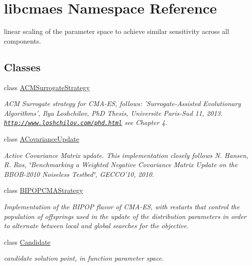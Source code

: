 \hypertarget{namespacelibcmaes}{\section{libcmaes Namespace Reference}
\label{namespacelibcmaes}
}


linear scaling of the parameter space to achieve similar sensitivity across all components.  


\subsection*{Classes}
\begin{DoxyCompactItemize}
\item 
class \hyperlink{classlibcmaes_1_1ACMSurrogateStrategy}{A\+C\+M\+Surrogate\+Strategy}
\begin{DoxyCompactList}\small\item\em A\+C\+M Surrogate strategy for C\+M\+A-\/\+E\+S, follows\+: 'Surrogate-\/\+Assisted Evolutionary Algorithms', Ilya Loshchilov, Ph\+D Thesis, Universite Paris-\/\+Sud 11, 2013. \href{http://www.loshchilov.com/phd.html}{\tt http\+://www.\+loshchilov.\+com/phd.\+html} see Chapter 4. \end{DoxyCompactList}\item 
class \hyperlink{classlibcmaes_1_1ACovarianceUpdate}{A\+Covariance\+Update}
\begin{DoxyCompactList}\small\item\em Active Covariance Matrix update. This implementation closely follows N. Hansen, R. Ros, \char`\"{}\+Benchmarking a Weighted Negative Covariance Matrix 
                           Update on the B\+B\+O\+B-\/2010 Noiseless Testbed\char`\"{}, G\+E\+C\+C\+O'10, 2010. \end{DoxyCompactList}\item 
class \hyperlink{classlibcmaes_1_1BIPOPCMAStrategy}{B\+I\+P\+O\+P\+C\+M\+A\+Strategy}
\begin{DoxyCompactList}\small\item\em Implementation of the B\+I\+P\+O\+P flavor of C\+M\+A-\/\+E\+S, with restarts that control the population of offsprings used in the update of the distribution parameters in order to alternate between local and global searches for the objective. \end{DoxyCompactList}\item 
class \hyperlink{classlibcmaes_1_1Candidate}{Candidate}
\begin{DoxyCompactList}\small\item\em candidate solution point, in function parameter space. \end{DoxyCompactList}\item 

\end{DoxyCompactItemize}
